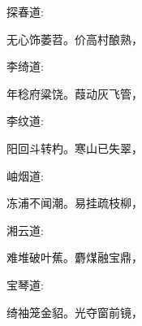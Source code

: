 \begin{parag}
    探春道:
\end{parag}


\begin{poem}
    \begin{pl} 无心饰萎苕。价高村酿熟，\end{pl}
\end{poem}


\begin{parag}
    李绮道:
\end{parag}


\begin{poem}
    \begin{pl} 年稔府粱饶。葭动灰飞管，\end{pl}
\end{poem}


\begin{parag}
    李纹道:
\end{parag}


\begin{poem}
    \begin{pl} 阳回斗转杓。寒山已失翠，\end{pl}
\end{poem}


\begin{parag}
    岫烟道:
\end{parag}


\begin{poem}
    \begin{pl} 冻浦不闻潮。易挂疏枝柳，\end{pl}
\end{poem}


\begin{parag}
    湘云道:
\end{parag}


\begin{poem}
    \begin{pl} 难堆破叶蕉。麝煤融宝鼎，\end{pl}
\end{poem}


\begin{parag}
    宝琴道:
\end{parag}


\begin{poem}
    \begin{pl} 绮袖笼金貂。光夺窗前镜，\end{pl}
\end{poem}


